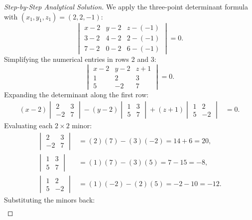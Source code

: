 \begin{proof}[Step-by-Step Analytical Solution]
We apply the three-point determinant formula with $(x_1, y_1, z_1) = (2, 2, -1)$:
\begin{equation}
    \begin{vmatrix}
    x - 2 & y - 2 & z - (-1) \\
    3 - 2 & 4 - 2 & 2 - (-1) \\
    7 - 2 & 0 - 2 & 6 - (-1)
    \end{vmatrix} = 0.
\end{equation}
Simplifying the numerical entries in rows 2 and 3:
\begin{equation}
    \begin{vmatrix}
    x - 2 & y - 2 & z + 1 \\
    1 & 2 & 3 \\
    5 & -2 & 7
    \end{vmatrix} = 0.
\end{equation}
Expanding the determinant along the first row:
\begin{align}
    (x - 2) \begin{vmatrix} 2 & 3 \\ -2 & 7 \end{vmatrix}
    - (y - 2) \begin{vmatrix} 1 & 3 \\ 5 & 7 \end{vmatrix}
    + (z + 1) \begin{vmatrix} 1 & 2 \\ 5 & -2 \end{vmatrix} &= 0.
\end{align}
Evaluating each $2 \times 2$ minor:
\begin{align}
    \begin{vmatrix} 2 & 3 \\ -2 & 7 \end{vmatrix} &= (2)(7) - (3)(-2) = 14 + 6 = 20, \\
    \begin{vmatrix} 1 & 3 \\ 5 & 7 \end{vmatrix} &= (1)(7) - (3)(5) = 7 - 15 = -8, \\
    \begin{vmatrix} 1 & 2 \\ 5 & -2 \end{vmatrix} &= (1)(-2) - (2)(5) = -2 - 10 = -12.
\end{align}
Substituting the minors back:
\begin{align}

\end{align}
\end{proof}

